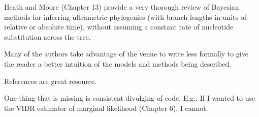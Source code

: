 \documentclass[letterpaper,12pt]{article}
\begin{document}
Heath and Moore (Chapter 13) provide a very thorough review of Bayesian methods
for inferring ultrametric phylogenies (with branch lengths in units  of
relative or absolute time), without assuming a constant rate of nucleotide
substitution across the tree.



Many of the authors take advantage of the venue to write less formally to give
the reader a better intuition of the models and methods being described.

References are great resource.

One thing that is missing is consistent divulging of code. E.g., 
If I wanted to use the VIDR estimator of marginal likelihood (Chapter 6),
I cannot.



\end{document}
